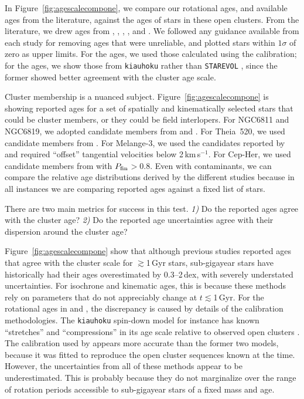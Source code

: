 \documentclass[11pt,twocolumn,tighten]{aastex63}
\newcommand{\kms}{{km\,s$^{-1}$}}
\begin{document}
In Figure~\ref{fig:agescalecompone}, we compare our rotational
ages, and available ages from the literature, against the ages of
stars in these open clusters. 
From the literature, we
drew ages from \citet{Reinhold_2015}, \citet{Berger_2020a_catalog},
\citet{2021AJ....161..189L}, \citet{2023ApJ...952..131M}, and
\citet{2024AJ....167..159L}.  We followed any guidance available from
each study for removing ages that were unreliable, and plotted stars
within $1\sigma$ of zero as upper limits.  For the
\citeauthor{Reinhold_2015} ages, we used those calculated using the
\citet{Mamajek_2008} calibration; for the
\citeauthor{2023ApJ...952..131M} ages, we show those from
\texttt{kiauhoku} \citep{Claytor2020} rather than \texttt{STAREVOL}
\citep{Amard2019}, since the former showed better agreement with the
cluster age scale.

Cluster membership is a nuanced subject.
Figure~\ref{fig:agescalecompone} is showing reported ages for a set of
spatially and kinematically selected stars that could be cluster
members, or they could be field interlopers.  For NGC6811 and NGC6819,
we adopted candidate members from
\citet{2018A&A...618A..93C,CantatGaudin_2020} and
\citet{Kounkel_2020}.  For Theia~520, we used candidate members from
\citet{Kounkel_2020}.  For Melange-3, we used the candidates reported
by \citet{Barber_2022} and required ``offset'' tangential velocities
below 2\,\kms.  For Cep-Her, we used candidate members from
\citet{Kerr2024} with $P_{\rm fin}$$>$0.8.  Even with
contaminants, we can compare the relative age distributions derived by
the different studies because in all instances we are comparing
reported ages against a fixed list of stars.

There are two main metrics for success in this test. {\it 1)} Do the
reported ages agree with the cluster age? {\it 2)} Do the reported age
uncertainties agree with their dispersion around the cluster age?

Figure~\ref{fig:agescalecompone} show that although previous studies
reported ages that agree with the cluster scale for $\gtrsim$1\,Gyr
stars, sub-gigayear stars have historically had their ages
overestimated by 0.3--2\,dex, with severely understated uncertainties.
For isochrone and kinematic ages, this is because these methods rely
on parameters that do not appreciably change at $t$$\lesssim$1\,Gyr.
For the rotational ages in \citet{2023ApJ...952..131M} and
\citet{2024AJ....167..159L}, the discrepancy is caused by details of
the calibration methodologies.  The \texttt{kiauhoku} spin-down model
for instance has known ``stretches'' and ``compressions'' in its age
scale relative to observed open clusters \citep[see][Sec.~7.3]{2023ApJ...952..131M}.  The \citet{Mamajek_2008} calibration used
by \citet{Reinhold_2015} appears more accurate than the former two
models, because it was fitted to reproduce the open cluster sequences
known at the time.  However, the uncertainties from all of these
methods appear to be underestimated.  This is probably because they do
not marginalize over the range of rotation periods accessible to
sub-gigayear stars of a fixed mass and age.
\end{document}
